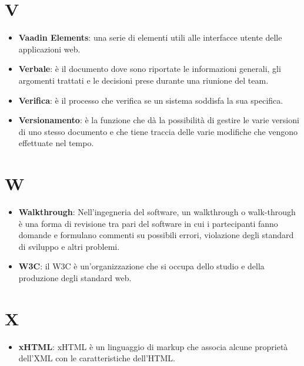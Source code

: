 \documentclass[a4paper, oneside, openany, dvipsnames, table]{article}
\begin{document}
\section{V}
\begin{itemize}
\item \textbf{Vaadin Elements}: una serie di elementi utili alle interfacce utente delle applicazioni web.
\item \textbf{Verbale}: è il documento dove sono riportate le informazioni generali, gli argomenti trattati e le decisioni prese durante una riunione del team.
\item \textbf{Verifica}: è il processo che verifica se un sistema soddisfa la sua specifica.
\item \textbf{Versionamento}: è la funzione che dà la possibilità di gestire le varie versioni di uno stesso documento e che tiene traccia delle varie modifiche che vengono effettuate nel tempo.
\end{itemize}

\section{W}
\begin{itemize}
\item \textbf{Walkthrough}: Nell'ingegneria del software, un walkthrough o walk-through è una forma di revisione tra pari del software in cui i partecipanti fanno domande e formulano commenti su possibili errori, violazione degli standard di sviluppo e altri problemi.
\item \textbf{W3C}: il W3C è un'organizzazione che si occupa dello studio e della produzione degli standard web.
\end{itemize}

\section{X}
\begin{itemize}
	\item \textbf{xHTML}: xHTML è un linguaggio di markup che associa alcune proprietà dell'XML con le caratteristiche dell'HTML.
\end{itemize}
\end{document}
